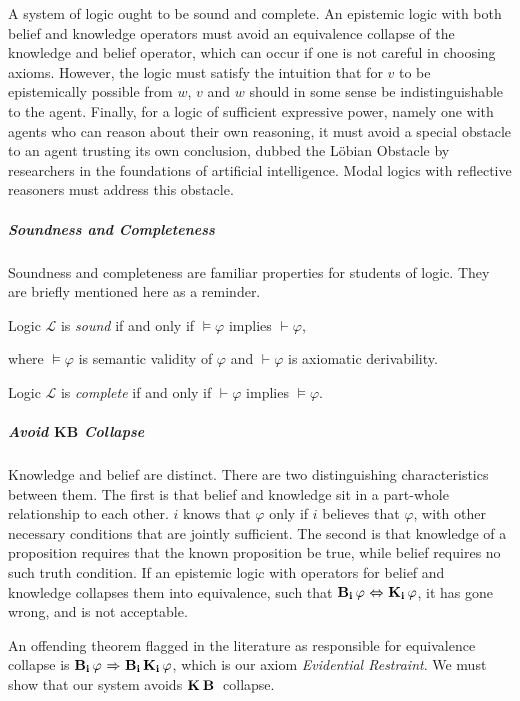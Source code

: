 A system of logic ought to be sound and complete. An epistemic logic with both belief and knowledge operators must avoid an equivalence collapse of the knowledge and belief operator, which can occur if one is not careful in choosing axioms. However, the logic must satisfy the intuition that for $v$ to be epistemically possible from $w$, $v$ and $w$ should in some sense be indistinguishable to the agent. Finally, for a logic of sufficient expressive power, namely one with agents who can reason about their own reasoning, it must avoid a special obstacle to an agent trusting its own conclusion, dubbed the L\"obian Obstacle by researchers in the foundations of artificial intelligence. Modal logics with reflective reasoners must address this obstacle. 

\subparagraph{Soundness and Completeness}
Soundness and completeness are familiar properties for students of logic. They are briefly mentioned here as a reminder.
\begin{definition}[Soundness]
	Logic $\mathcal{L}$ is \emph{sound} if and only if $\models\varphi$ implies $\vdash\varphi$,
\end{definition}
where $\models\varphi$ is semantic validity of $\varphi$ and $\vdash\varphi$ is axiomatic derivability.

\begin{definition}[Completeness]
	Logic $\mathcal{L}$ is \emph{complete} if and only if $\vdash\varphi$ implies $\models\varphi$.
\end{definition}

\subparagraph{Avoid $\mathbf{KB}$ Collapse}
Knowledge and belief are distinct. There are two distinguishing characteristics between them. The first is that belief and knowledge sit in a part-whole relationship to each other. $i$ knows that $\varphi$ only if $i$ believes that $\varphi$, with other necessary conditions that are jointly sufficient. The second is that knowledge of a proposition requires that the known proposition be true, while belief requires no such truth condition. If an epistemic logic with operators for belief and knowledge collapses them into equivalence, such that $\mathbf{B}_{\mathbf{i}}\,\varphi {\ \Leftrightarrow \ } \mathbf{K}_{\mathbf{i}}\,\varphi$, it has gone wrong, and is not acceptable.

An offending theorem flagged in the literature as responsible for equivalence collapse is $\mathbf{B}_{\mathbf{i}}\,\varphi {\ \Rightarrow \ } \mathbf{B}_{\mathbf{i}}\,\mathbf{K}_{\mathbf{i}}\,\varphi$, which is our axiom \emph{Evidential Restraint}. We must show that our system avoids $\mathbf{K}_{\mathbf{}}\,\mathbf{B}_{\mathbf{}}\,$ collapse.

